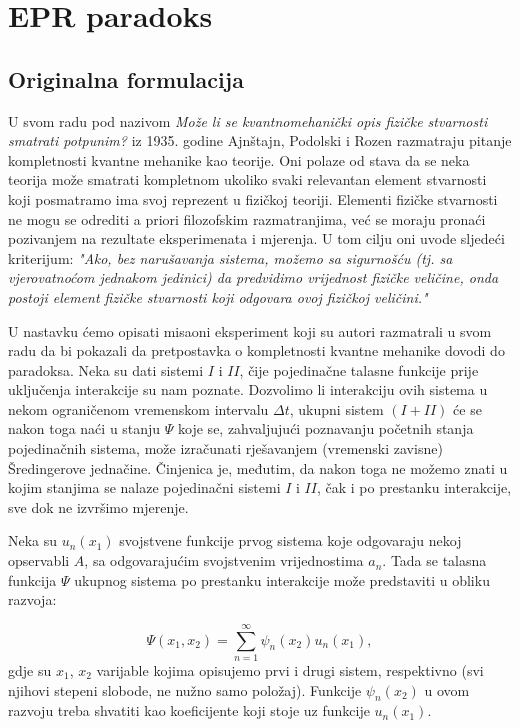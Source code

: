 \chapter{EPR paradoks}
\section{Originalna formulacija}
U svom radu pod nazivom {\it{Može li se kvantnomehanički opis fizičke stvarnosti smatrati potpunim?}} iz 1935. godine Ajnštajn, Podolski i Rozen razmatraju pitanje kompletnosti kvantne mehanike kao teorije.
Oni polaze od stava da se neka teorija može smatrati kompletnom ukoliko  svaki relevantan element stvarnosti koji posmatramo ima svoj reprezent u fizičkoj teoriji.
Elementi fizičke stvarnosti ne mogu se odrediti a priori filozofskim razmatranjima, već se moraju pronaći pozivanjem na rezultate eksperimenata i mjerenja. U tom cilju oni uvode sljedeći kriterijum: {\it{"Ako, bez narušavanja sistema, možemo sa sigurnošću (tj. sa vjerovatnoćom jednakom jedinici) da predvidimo vrijednost fizičke veličine, onda postoji element fizičke stvarnosti koji odgovara ovoj fizičkoj veličini."}}


U nastavku ćemo opisati misaoni eksperiment koji su autori razmatrali u svom radu da bi pokazali da pretpostavka o kompletnosti kvantne mehanike dovodi do paradoksa.
Neka su dati sistemi $I$ i $II$, čije pojedinačne talasne funkcije prije uklju\v cenja interakcije su nam poznate. Dozvolimo li interakciju ovih sistema u nekom ograničenom vremenskom intervalu $\Delta t$,
ukupni sistem $(I + II)$ će se nakon toga naći u stanju $\Psi$ koje se, zahvaljujući poznavanju početnih stanja pojedinačnih sistema,
može izračunati rješavanjem (vremenski zavisne) Šredingerove jednačine.
Činjenica je, međutim, da nakon toga ne možemo znati u kojim stanjima se nalaze pojedinačni sistemi $I$ i $II$, čak i po prestanku interakcije, sve dok ne izvršimo mjerenje.

Neka su $u_n(x_1)$ svojstvene funkcije prvog sistema koje odgovaraju nekoj opservabli $A$, sa odgovarajućim svojstvenim vrijednostima $a_n$.
Tada se talasna funkcija $\Psi$ ukupnog sistema po prestanku interakcije može predstaviti u obliku razvoja:

\begin{equation}
    \Psi(x_1, x_2) = \sum_{n=1}^{\infty} \psi_n(x_2)u_n(x_1), \label{eq:talasna_funkcija_ukupnog_sistema_nakon_interakcije}
\end{equation}
gdje su $x_1$, $x_2$ varijable kojima opisujemo prvi i drugi sistem, respektivno (svi njihovi stepeni slobode, ne nužno samo položaj).
Funkcije $\psi_n(x_2)$ u ovom razvoju treba shvatiti kao koeficijente koji stoje uz funkcije $u_n(x_1)$.

